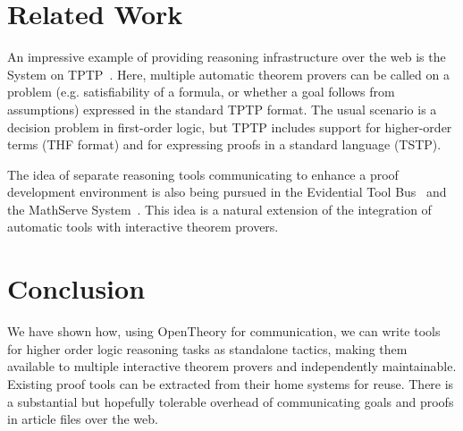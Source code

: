 \documentclass{llncs}
\newcommand{\OpenTheory}{OpenTheory\xspace}
\newcommand{\eg}{e.g.\xspace}
\begin{document}



\section{Related Work}

An impressive example of providing reasoning infrastructure over the web is the System on TPTP~\cite{DBLP:conf/lpar/Sutcliffe10}.
Here, multiple automatic theorem provers can be called on a problem (\eg satisfiability of a formula, or whether a goal follows from assumptions) expressed in the standard TPTP format.
The usual scenario is a decision problem in first-order logic, but TPTP includes support for higher-order terms (THF format) and for expressing proofs in a standard language (TSTP).

The idea of separate reasoning tools communicating to enhance a proof development environment is also being pursued in the Evidential Tool Bus~\cite{DBLP:conf/icfem/Rushby05} and the MathServe System~\cite{DBLP:conf/cade/ZimmerA06}.
This idea is a natural extension of the integration of automatic tools with interactive theorem provers.

\section{Conclusion}

We have shown how, using \OpenTheory for communication, we can write tools for higher order logic reasoning tasks as standalone tactics, making them available to multiple interactive theorem provers and independently maintainable.
Existing proof tools can be extracted from their home systems for reuse.
There is a substantial but hopefully tolerable overhead of communicating goals and proofs in article files over the web.



\end{document}
